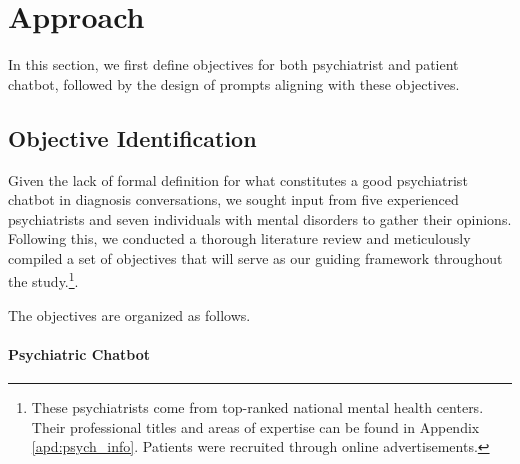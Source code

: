 \section{Approach}

In this section, we first define objectives for both psychiatrist and patient chatbot, followed by the design of prompts aligning with these objectives.

\subsection{Objective Identification}
\label{sec:objectives}
Given the lack of formal definition for what constitutes a good psychiatrist chatbot in diagnosis conversations, we sought input from five experienced psychiatrists and seven individuals with mental disorders to gather their opinions. Following this, we conducted a thorough literature review \cite{yao-etal-2022-d4,bao-etal-2021-plato,sun-etal-2023-moraldial} and meticulously compiled a set of objectives that will serve as our guiding framework throughout the study.\footnote{These psychiatrists come from top-ranked national mental health centers. 
Their professional titles and areas of expertise can be found in 
Appendix \ref{apd:psych_info}. Patients were recruited through online advertisements.}. 

The objectives are organized as follows.
\paragraph{Psychiatric Chatbot}




